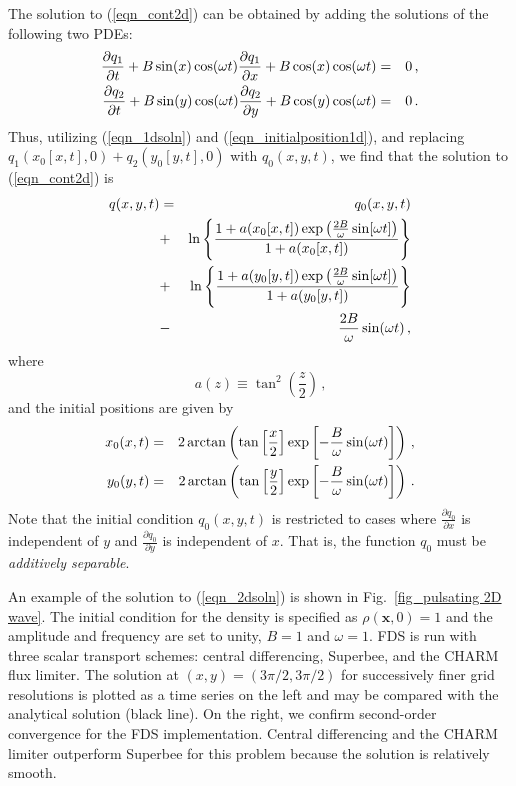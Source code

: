 \documentclass[11pt]{book}
\begin{document}
The solution to (\ref{eqn_cont2d}) can be obtained by adding the solutions of the following two PDEs:
\begin{eqnarray}
\label{eqn_linearpdes}
\frac{\partial q_1}{\partial t} + B \sin(x) \cos(\omega t) \frac{\partial q_1}{\partial x} + B \cos(x) \cos(\omega t) &=& 0 \,\mbox{,} \vspace{0.3cm} \\
\frac{\partial q_2}{\partial t} + B \sin(y) \cos(\omega t) \frac{\partial q_2}{\partial y} + B \cos(y) \cos(\omega t) &=& 0 \,\mbox{.}
\end{eqnarray}
Thus, utilizing (\ref{eqn_1dsoln}) and (\ref{eqn_initialposition1d}), and replacing $q_1(x_0[x,t],0) + q_2(y_0[y,t],0)$ with $q_0(x,y,t)$, we find that the solution to (\ref{eqn_cont2d}) is
\begin{eqnarray}
\label{eqn_2dsoln}
q(x,y,t) &=& q_0(x,y,t) \nonumber\vspace{0.3cm}\\
&+& \ln \left\{ \frac{1 + a(x_0[x,t]) \exp \left( \frac{2B}{\omega} \sin[\omega t] \right)}{1 + a(x_0[x,t])} \right\} \nonumber\vspace{0.3cm}\\
&+& \ln \left\{ \frac{1 + a(y_0[y,t]) \exp \left( \frac{2B}{\omega} \sin[\omega t] \right)}{1 + a(y_0[y,t])} \right\} \nonumber\vspace{0.3cm}\\
&-& \frac{2B}{\omega} \sin(\omega t) \,\mbox{,}
\end{eqnarray}
where
\begin{equation}
\label{eqn_a}
a(z) \equiv \tan^2\left(\frac{z}{2}\right) \,\mbox{,}
\end{equation}
and the initial positions are given by
\begin{eqnarray}
\label{eqn_initpos2d}
x_0(x,t) &=& 2 \arctan\left( \tan\left[\frac{x}{2}\right] \exp\left[-\frac{B}{\omega}\sin(\omega t)\right] \right) \,\mbox{,} \vspace{0.3cm}\\
y_0(y,t) &=& 2 \arctan\left( \tan\left[\frac{y}{2}\right] \exp\left[-\frac{B}{\omega}\sin(\omega t)\right] \right) \,\mbox{.}
\end{eqnarray}
Note that the initial condition $q_0(x,y,t)$ is restricted to cases where $\frac{\partial q_0}{\partial x}$ is independent of $y$ and $\frac{\partial q_0}{\partial y}$ is independent of $x$.  That is, the function $q_0$ must be \emph{additively separable}.

An example of the solution to (\ref{eqn_2dsoln}) is shown in Fig.~\ref{fig_pulsating 2D wave}. The initial condition for the density is specified as $\rho(\mathbf{x},0) = 1$ and the amplitude and frequency are set to unity, $B=1$ and $\omega=1$.  FDS is run with three scalar transport schemes: central differencing, Superbee, and the CHARM flux limiter. The solution at $(x,y) = (3\pi/2, 3\pi/2)$ for successively finer grid resolutions is plotted as a time series on the left and may be compared with the analytical solution (black line). On the right, we confirm second-order convergence for the FDS implementation.  Central differencing and the CHARM limiter outperform Superbee for this problem because the solution is relatively smooth.
\end{document}
